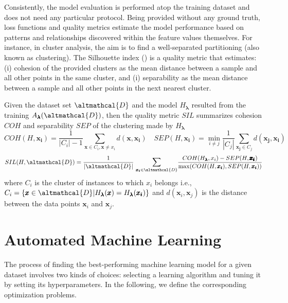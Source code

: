 Consistently, the model evaluation is performed atop the training dataset and does not need any particular protocol.
Being provided without any ground truth, loss functions and quality metrics estimate the model performance based on patterns and relationships discovered within the feature values themselves.
For instance, in cluster analysis, the aim is to find a well-separated partitioning (also known as clustering).
The Silhouette index () is a quality metric that estimates: (i) cohesion of the provided clusters as the mean distance between a sample and all other points in the same cluster, and (i) separability as the mean distance between a sample and all other points in the next nearest cluster.

\begin{example}\label{ex:sil}
    Given the dataset set $\altmathcal{D}$ and the model $H_{\pmb{\lambda}}$ resulted from the training $A_{\pmb{\lambda}}(\altmathcal{D})$, then the quality metric $SIL$ summarizes cohesion $COH$ and separability $SEP$ of the clustering made by $H_{\pmb{\lambda}}$
    \begin{equation*}
        COH(H, \pmb{x_i}) = \frac{1}{|C_{i}| - 1} \sum_{\pmb{x} \in C_{i}, \pmb{x} \neq x_i} d(\pmb{x}, \pmb{x_i}) \quad
        SEP(H, \pmb{x_i}) = \min_{i \neq j} \frac{1}{|C_j|} \sum_{\pmb{x_j} \in C_j} d(\pmb{x_j}, \pmb{x_i})
    \end{equation*}
    \begin{equation*}
        SIL(H, \altmathcal{D}) = \frac{1}{|\altmathcal{D}|}~\mathlarger{\sum}_{\pmb{x_i} \in \altmathcal{D}} \frac{COH(H_{\pmb{\lambda}}, x_i) - SEP(H, \pmb{\pmb{x_i}})}{\max(COH(H, \pmb{x_i}), SEP(H, \pmb{x_i}))}
    \end{equation*}
    where $C_i$ is the cluster of instances to which $x_i$ belongs i.e., $C_i = \{\pmb{x} \in \altmathcal{D} | H_{\pmb{\lambda}}(\pmb{x}) = H_{\pmb{\lambda}}(\pmb{x_i})\}$ and $d(\pmb{x}_i, \pmb{x}_j)$ is the distance between the data points $\pmb{x}_i$ and $\pmb{x}_j$.
\end{example}

\section{Automated Machine Learning}\label{automl-background-sec:automl}


The process of finding the best-performing machine learning model for a given dataset involves two kinds of choices: selecting a learning algorithm and tuning it by setting its hyperparameters.
In the following, we define the corresponding optimization problems.

